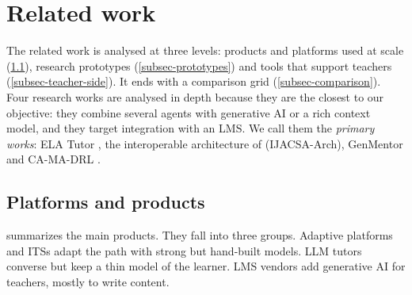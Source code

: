 \section{Related work}
\label{sec-related-work}

The related work is analysed at three levels: products and platforms used
at scale (\cref{subsec-products}), research prototypes
(\cref{subsec-prototypes}) and tools that support teachers
(\cref{subsec-teacher-side}). It ends with a comparison grid
(\cref{subsec-comparison}). Four research works are analysed in depth
because they are the closest to our objective: they combine several agents
with generative AI or a rich context model, and they target integration
with an LMS. We call them the \emph{primary works}: ELA Tutor
\cite{lopezgoyez2026ela,lopezgoyez2026exploratory}, the interoperable
architecture of \citet{khaddar2026ijacsa} (IJACSA-Arch), GenMentor
\cite{wang2025genmentor} and CA-MA-DRL \cite{sharif2026camadrl}.

\subsection{Platforms and products}
\label{subsec-products}

 summarizes the main products. They fall into three
groups. Adaptive platforms and ITSs adapt the path with strong but
hand-built models. LLM tutors converse but keep a thin model of the
learner. LMS vendors add generative AI for teachers, mostly to write
content.

